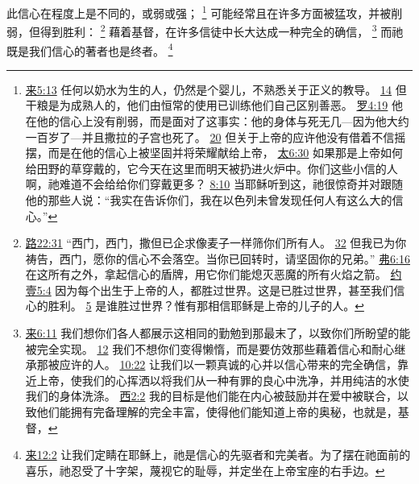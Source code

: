 \documentclass[12pt, a4paper, oneside]{ctexart}
\newcounter{parnum}[section]
\newcommand{\N}{%
   \noindent\refstepcounter{parnum}%
    \makebox[\parindent][l]{\textbf{\arabic{parnum}.}}}
\begin{document}
\N 此信心在程度上是不同的，或弱或强；
	\footnote {
		\href{https://biblehub.com/hebrews/5-13.htm}{来5:13} 任何以奶水为生的人，仍然是个婴儿，不熟悉关于正义的教导。
		\href{https://biblehub.com/hebrews/5-14.htm}{14} 但干粮是为成熟人的，他们由恒常的使用已训练他们自己区别善恶。
		\href{https://biblehub.com/romans/4-19.htm}{罗4:19} 他在他的信心上没有削弱，而是面对了这事实：他的身体与死无几---因为他大约一百岁了---并且撒拉的子宫也死了。
		\href{https://biblehub.com/romans/4-20.htm}{20} 但关于上帝的应许他没有借着不信摇摆，而是在他的信心上被坚固并将荣耀献给上帝，
		\href{https://biblehub.com/matthew/6-30.htm}{太6:30} 如果那是上帝如何给田野的草穿戴的，它今天在这里而明天被扔进火炉中。你们这些小信的人啊，祂难道不会给给你们穿戴更多？
		\href{https://biblehub.com/matthew/8-10.htm}{8:10} 当耶稣听到这，祂很惊奇并对跟随他的那些人说：“我实在告诉你们，我在以色列未曾发现任何人有这么大的信心。”
	}
	可能经常且在许多方面被猛攻，并被削弱，但得到胜利：
	\footnote {
		\href{https://biblehub.com/luke/22-31.htm}{路22:31} “西门，西门，撒但已企求像麦子一样筛你们所有人。
		\href{https://biblehub.com/luke/22-32.htm}{32} 但我已为你祷告，西门，愿你的信心不会落空。当你已回转时，请坚固你的兄弟。”
		\href{https://biblehub.com/ephesians/6-16.htm}{弗6:16} 在这所有之外，拿起信心的盾牌，用它你们能熄灭恶魔的所有火焰之箭。
		\href{https://biblehub.com/1_john/5-4.htm}{约壹5:4} 因为每个出生于上帝的人，都胜过世界。这是已胜过世界，甚至我们信心的胜利。
		\href{https://biblehub.com/1_john/5-5.htm}{5} 是谁胜过世界？惟有那相信耶稣是上帝的儿子的人。
	}
	藉着基督，在许多信徒中长大达成一种完全的确信，
	\footnote {
		\href{https://biblehub.com/hebrews/6-11.htm}{来6:11} 我们想你们各人都展示这相同的勤勉到那最末了，以致你们所盼望的能被完全实现。
		\href{https://biblehub.com/hebrews/6-12.htm}{12} 我们不想你们变得懒惰，而是要仿效那些藉着信心和耐心继承那被应许的人。
		\href{https://biblehub.com/hebrews/10-22.htm}{10:22} 让我们以一颗真诚的心并以信心带来的完全确信，靠近上帝，使我们的心挥洒以将我们从一种有罪的良心中洗净，并用纯洁的水使我们的身体洗涤。
		\href{https://biblehub.com/colossians/2-2.htm}{西2:2} 我的目标是他们能在内心被鼓励并在爱中被联合，以致他们能拥有完备理解的完全丰富，使得他们能知道上帝的奥秘，也就是，基督，
	}
	而祂既是我们信心的著者也是终者。
	\footnote {
		\href{https://biblehub.com/hebrews/12-2.htm}{来12:2} 让我们定睛在耶稣上，祂是信心的先驱者和完美者。为了摆在祂面前的喜乐，祂忍受了十字架，蔑视它的耻辱，并定坐在上帝宝座的右手边。
	}
\end{document}
